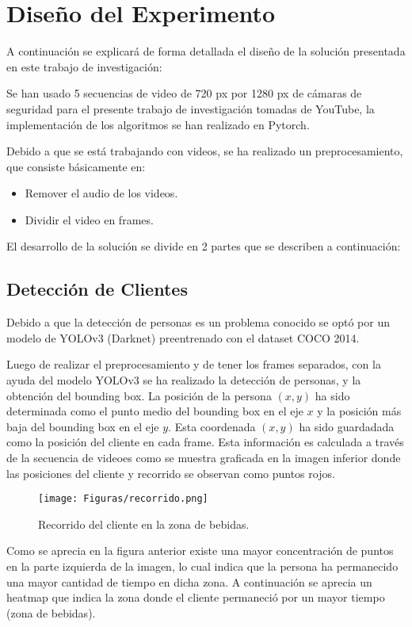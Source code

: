 \documentclass[conference]{IEEEtran}
\begin{document}
\section{Diseño del Experimento}
A continuación se explicará de forma detallada el diseño de la solución presentada en este trabajo de investigación:

Se han usado 5 secuencias de video  de 720 px por 1280 px de cámaras de seguridad para el presente trabajo de investigación tomadas de YouTube, la implementación de los algoritmos se han realizado en Pytorch.

Debido a que se está trabajando con videos, se ha realizado un preprocesamiento, que consiste básicamente en:
\begin{itemize}
\item Remover el audio de los videos.
\item Dividir el video en frames.
\end{itemize}

El desarrollo de la solución se divide en 2 partes que se describen a continuación:
\subsection{Detección de Clientes}
Debido a que la detección de personas es un problema conocido se optó por un modelo de YOLOv3 (Darknet) preentrenado con el dataset COCO 2014.

Luego de realizar el preprocesamiento y de tener los frames separados, con la ayuda del modelo YOLOv3 se ha realizado la detección de personas, y la obtención del bounding box. La posición de la persona $(x, y)$ ha sido determinada como el punto medio del bounding box en el eje $x$ y la posición más baja del bounding box en el eje $y$. Esta coordenada $(x, y)$ ha sido guardadada como la posición del cliente en cada frame. Esta información es calculada a través de la secuencia de videoes como se muestra  graficada en la imagen inferior donde las posiciones del cliente y recorrido se observan como puntos rojos.

\begin{figure}[hbtp]
\centering
\texttt{[image: Figuras/recorrido.png]}
\caption{Recorrido del cliente en la zona de bebidas.}
\label{fig:recorrido}
\end{figure}

Como se aprecia en la figura anterior existe una mayor concentración de puntos en la parte izquierda de la imagen, lo cual indica que la persona ha permanecido una mayor cantidad de tiempo en dicha zona. A continuación se aprecia un heatmap que indica la zona donde el cliente permaneció por un mayor tiempo (zona de bebidas).
\end{document}
